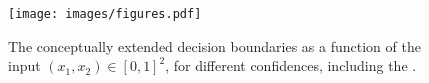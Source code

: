 %
%
 \begin{figure}[t]
    \centering
  \texttt{[image: images/figures.pdf]}
    \caption{The conceptually extended decision boundaries as a function of the input $(x_1,x_2)\in[0,1]^2$, for different confidences, including the \propa.}
    \label{fig::formalization_beta}
\end{figure}  
%
